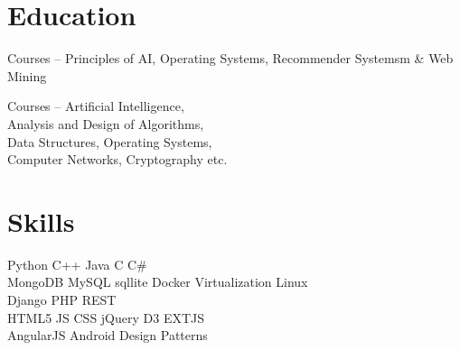 \documentclass[]{deedy-resume-openfont}
\begin{document}
    
    \lastupdated
    
    
    
    
    
    \begin{minipage}[t]{0.33\textwidth} 
    
    
    \section{Education} 
    
    Courses – Principles of AI, Operating Systems, Recommender Systemsm \& Web Mining
    \sectionsep
    
    Courses – Artificial Intelligence, \\Analysis and Design of Algorithms, \\Data Structures, Operating Systems, \\Computer Networks, Cryptography etc.
    \sectionsep
    
    
    
    \section{Skills}
    Python \textbullet{}   C++ \textbullet{} Java \textbullet{} C \textbullet{} C\# \\
    MongoDB \textbullet{} MySQL \textbullet{} sqllite 
    Docker \textbullet{} Virtualization \textbullet{} Linux \\
    Django \textbullet{} PHP \textbullet{} REST \\
    HTML5 \textbullet{} JS \textbullet{} CSS \textbullet{} jQuery \textbullet{} D3 \textbullet{} EXTJS\\
    AngularJS \textbullet{}  Android \textbullet{} Design Patterns
    \sectionsep
    

\end{minipage}
\end{document}

